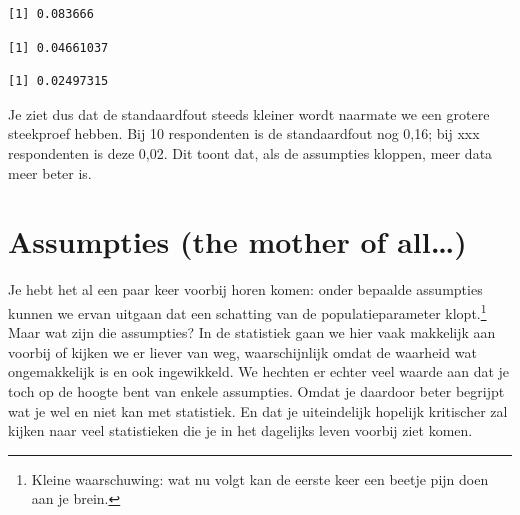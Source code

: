 \documentclass[
  letterpaper,
  DIV=11,
  numbers=noendperiod]{scrreprt}
\newenvironment{Shaded}{\begin{snugshade}}{\end{snugshade}}
\newcommand{\CommentTok}[1]{\textcolor[rgb]{0.37,0.37,0.37}{#1}}
\newcommand{\FunctionTok}[1]{\textcolor[rgb]{0.28,0.35,0.67}{#1}}
\newcommand{\NormalTok}[1]{\textcolor[rgb]{0.00,0.23,0.31}{#1}}
\newcommand{\SpecialCharTok}[1]{\textcolor[rgb]{0.37,0.37,0.37}{#1}}
\begin{document}
\begin{verbatim}
[1] 0.083666
\end{verbatim}

\begin{Shaded}
\end{Shaded}

\begin{verbatim}
[1] 0.04661037
\end{verbatim}

\begin{Shaded}
\end{Shaded}

\begin{verbatim}
[1] 0.02497315
\end{verbatim}

Je ziet dus dat de standaardfout steeds kleiner wordt naarmate we een
grotere steekproef hebben. Bij 10 respondenten is de standaardfout nog
0,16; bij xxx respondenten is deze 0,02. Dit toont dat, als de
assumpties kloppen, meer data meer beter is.

\section{Assumpties (the mother of
all\ldots)}\label{assumpties-the-mother-of-all}

Je hebt het al een paar keer voorbij horen komen: onder bepaalde
assumpties kunnen we ervan uitgaan dat een schatting van de
populatieparameter klopt.\footnote{Kleine waarschuwing: wat nu volgt kan
  de eerste keer een beetje pijn doen aan je brein.} Maar wat zijn die
assumpties? In de statistiek gaan we hier vaak makkelijk aan voorbij of
kijken we er liever van weg, waarschijnlijk omdat de waarheid wat
ongemakkelijk is en ook ingewikkeld. We hechten er echter veel waarde
aan dat je toch op de hoogte bent van enkele assumpties. Omdat je
daardoor beter begrijpt wat je wel en niet kan met statistiek. En dat je
uiteindelijk hopelijk kritischer zal kijken naar veel statistieken die
je in het dagelijks leven voorbij ziet komen.
\end{document}
